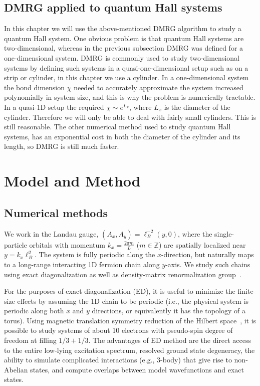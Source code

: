 \subsection{DMRG applied to quantum Hall systems}

In this chapter we will use the above-mentioned DMRG algorithm to study a quantum Hall system. One obvious problem is that quantum Hall systems are two-dimensional, whereas in the previous subsection DMRG was defined for a one-dimensional system. DMRG is commonly used to study two-dimensional systems by defining such systems in a quasi-one-dimensional setup such as on a strip or cylinder, in this chapter we use a cylinder. In a one-dimensional system the bond dimension $\chi$ needed to accurately approximate the system increased polynomially in system size, and this is why the problem is numerically tractable. In a quasi-1D setup the required $\chi\sim e^{L_x}$, where $L_x$ is the diameter of the cylinder. Therefore we will only be able to deal with fairly small cylinders. This is still reasonable. The other numerical method used to study quantum Hall systems, has an exponential cost in both the diameter of the cylinder and its length, so DMRG is still much faster.




\section{Model and Method}\label{sec:method}

\subsection{Numerical methods}\label{sec:numerics}

We work in the Landau gauge, $(A_x,A_y)=\ell_B^{-2}(y,0)$, where the single-particle orbitals with momentum $k_x=\frac{2\pi m}{L}$ ($m \in \mathbb{Z}$) are spatially localized near $y = k_x \ell_B^2$. 
The system is fully periodic along the $x$-direction, but naturally maps to a long-range interacting 1D fermion chain along $y$-axis.
We study such chains using exact diagonalization as well as density-matrix renormalization group~\cite{ZaletelQHdmrg13, ZaletelMixing}.

For the purposes of exact diagonalization (ED), it is useful to minimize the finite-size effects by assuming the 1D chain to be periodic (i.e., the physical system is  periodic along both $x$ and $y$ directions, or equivalently it has the topology of a torus). 
Using magnetic translation symmetry reduction of the Hilbert space~\cite{Haldane-PhysRevLett.55.2095}, it is possible to study systems of about 10 electrons with pseudo-spin degree of freedom at filling $1/3+1/3$. 
The advantages of ED method are the direct access to the entire low-lying excitation spectrum, resolved ground state degeneracy, the ability to simulate complicated interactions (e.g., 3-body) that give rise to non-Abelian states, and compute overlaps between model wavefunctions and exact states.

